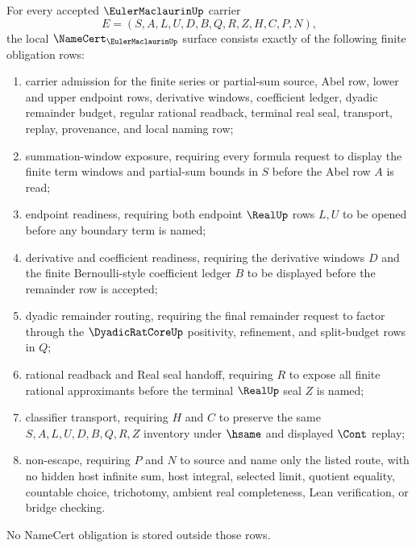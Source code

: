 \begin{theorem}
\label{thm:euler-maclaurin-namecert-obligations}
For every accepted $\EulerMaclaurinUp$ carrier
$$
E=(S,A,L,U,D,B,Q,R,Z,H,C,P,N),
$$
the local $\NameCert_{\EulerMaclaurinUp}$ surface consists exactly of the following finite obligation rows:
\begin{enumerate}
\item carrier admission for the finite series or partial-sum source, Abel row, lower and upper endpoint rows, derivative windows, coefficient ledger, dyadic remainder budget, regular rational readback, terminal real seal, transport, replay, provenance, and local naming row;
\item summation-window exposure, requiring every formula request to display the finite term windows and partial-sum bounds in $S$ before the Abel row $A$ is read;
\item endpoint readiness, requiring both endpoint $\RealUp$ rows $L,U$ to be opened before any boundary term is named;
\item derivative and coefficient readiness, requiring the derivative windows $D$ and the finite Bernoulli-style coefficient ledger $B$ to be displayed before the remainder row is accepted;
\item dyadic remainder routing, requiring the final remainder request to factor through the $\DyadicRatCoreUp$ positivity, refinement, and split-budget rows in $Q$;
\item rational readback and Real seal handoff, requiring $R$ to expose all finite rational approximants before the terminal $\RealUp$ seal $Z$ is named;
\item classifier transport, requiring $H$ and $C$ to preserve the same $S,A,L,U,D,B,Q,R,Z$ inventory under $\hsame$ and displayed $\Cont$ replay;
\item non-escape, requiring $P$ and $N$ to source and name only the listed route, with no hidden host infinite sum, host integral, selected limit, quotient equality, countable choice, trichotomy, ambient real completeness, Lean verification, or bridge checking.
\end{enumerate}
No NameCert obligation is stored outside those rows.
\end{theorem}
